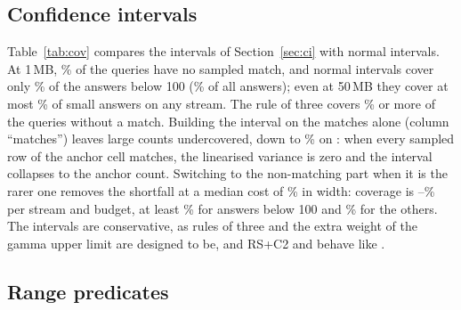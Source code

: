 \subsection{Confidence intervals}\label{sec:cires}

\begin{table}[t]
\centering\small\setlength{\tabcolsep}{2.6pt}
\caption{Coverage (\%) of nominal 95\% intervals, mean over the six streams of
Figure~\ref{fig:nae} (record-sampled and anchored queries, 5 seeds). Normal: $\hat f_{\mathrm C}\pm1.96
\sqrt{\hat V_{\mathrm C}}$. Matches: rule of three and gamma interval on the matches only. Rarer side:
Section~\ref{sec:ci}; $m{=}0$: queries without a sampled match.}
\label{tab:cov}

\end{table}

Table~\ref{tab:cov} compares the intervals of Section~\ref{sec:ci} with normal intervals. At 1\,MB,
\NumCiFracZeroOneMb\% of the queries have no sampled match, and normal intervals cover only
\NumCiNormSmallOneMb\% of the answers below 100 (\NumCiNormAllOneMb\% of all answers); even at 50\,MB they
cover at most \NumCiNormSmallHi\% of small answers on any stream. The rule of three covers
\NumCiNewZeroLo\% or more of the queries without a match. Building the interval on the matches alone
(column ``matches'') leaves large counts undercovered, down to \NumCiOneSidedBigLo\% on \NumCiOneSidedBigWorst:
when every sampled row of the anchor cell matches, the linearised variance is zero and the interval
collapses to the anchor count. Switching to the non-matching part when it is the rarer one removes the
shortfall at a median cost of \NumCiWidthGain\% in width: coverage is
\NumCiNewLo--\NumCiNewHi\% per stream and budget, at least \NumCiNewSmallLo\% for answers below 100 and
\NumCiNewBigLo\% for the others. The intervals are conservative, as rules of three and the extra weight
of the gamma upper limit are designed to be, and \textsc{RS+C2} and \csh behave like \cs.

\subsection{Range predicates}\label{sec:rangeres}

\begin{table}[t]
\centering\footnotesize\setlength{\tabcolsep}{2.6pt}
\caption{Normalized absolute error on range workloads ($k=1..4$ predicates with one or two ranges, equal
weight per $k$; mean of 3 seeds). \omni: best of six dyadic configurations per cell.}
\label{tab:range}

\end{table}

